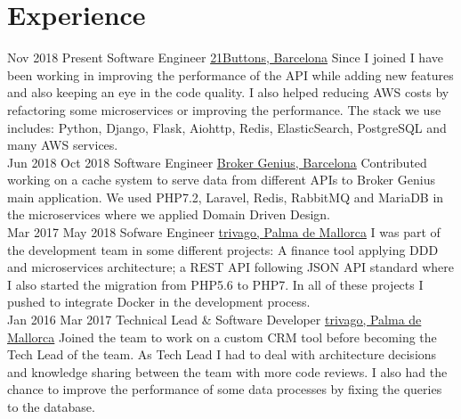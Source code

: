 \documentclass[letterpaper]{twentysecondcv} %
\begin{document}
\makeprofile %



\section{Experience}

\begin{twenty} %
\twentyitem
	{Nov 2018}
	{Present}
	{Software Engineer}
	{\href{https://www.21buttons.com}{21Buttons, Barcelona}}
	{Since I joined I have been working in improving the performance of the API while adding new features and also keeping an eye in the code quality. I also helped reducing AWS costs by refactoring some microservices or improving the performance. The stack we use includes: Python, Django, Flask, Aiohttp, Redis, ElasticSearch, PostgreSQL and many AWS services.}
	\\
\twentyitem
	{Jun 2018}
	{Oct 2018}
	{Software Engineer}
	{\href{https://brokergenius.com}{Broker Genius, Barcelona}}
	{Contributed working on a cache system to serve data from different APIs to Broker Genius main application. We used PHP7.2, Laravel, Redis, RabbitMQ and MariaDB in the microservices where we applied Domain Driven Design.}
	\\
\twentyitem
    	{Mar 2017}
		{May 2018}
        {Sofware Engineer}
        {\href{https://www.trivago.com}{trivago, Palma de Mallorca}}
		{I was part of the development team in some different projects: A finance tool applying DDD and microservices architecture; a REST API following JSON API standard where I also started the migration from PHP5.6 to PHP7. In all of these projects I pushed to integrate Docker in the development process.}
        \\
\twentyitem
    	{Jan 2016}
		{Mar 2017}
        {Technical Lead \& Software Developer}
        {\href{https://www.trivago.com}{trivago, Palma de Mallorca}}
		{Joined the team to work on a custom CRM tool before becoming the Tech Lead of the team. As Tech Lead I had to deal with architecture decisions and knowledge sharing between the team with more code reviews. I also had the chance to improve the performance of some data processes by fixing the queries to the database.}
        \\

\end{twenty}
\end{document}
